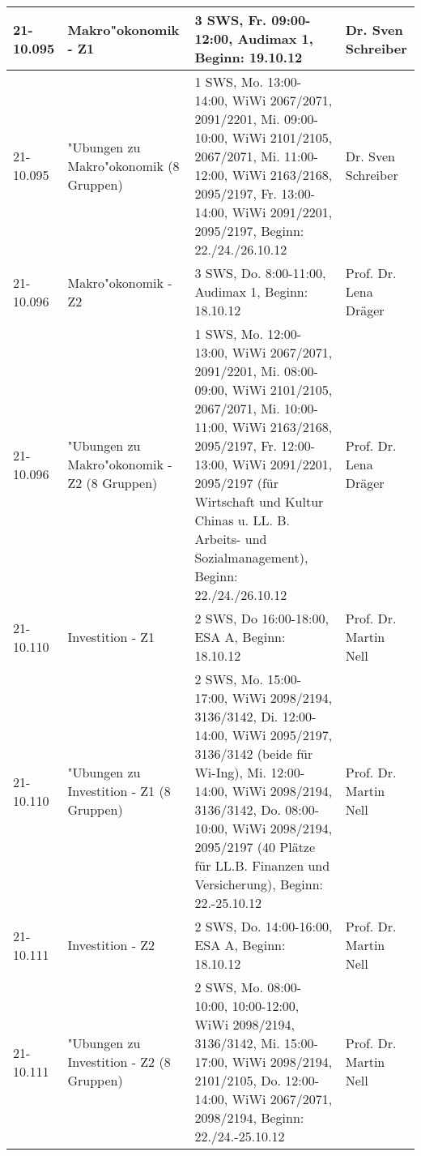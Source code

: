 \begin{tabularx}{\textwidth}{|l|X|X|X|}
%
%
\hline
\end{tabularx}
\begin{tabularx}{\textwidth}{|l|X|X|X|}
\hline 21-10.095 & Makro"okonomik - Z1
			& 3 SWS, Fr. 09:00-12:00, Audimax 1, Beginn: 19.10.12
			& Dr. Sven Schreiber \\
\hline 21-10.095 & "Ubungen zu Makro"okonomik (8 Gruppen)
			& 1 SWS, Mo. 13:00-14:00, WiWi 2067/2071, 2091/2201, Mi. 09:00-10:00, WiWi 2101/2105, 2067/2071, Mi. 11:00-12:00, WiWi 2163/2168, 2095/2197, Fr. 13:00-14:00, WiWi 2091/2201, 2095/2197, Beginn: 22./24./26.10.12
			& Dr. Sven Schreiber \\
\hline 21-10.096 & Makro"okonomik - Z2
			& 3 SWS, Do. 8:00-11:00, Audimax 1, Beginn: 18.10.12
			& Prof. Dr. Lena Dräger \\
\hline 21-10.096 & "Ubungen zu Makro"okonomik - Z2 (8 Gruppen)
			& 1 SWS, Mo. 12:00-13:00, WiWi 2067/2071, 2091/2201, Mi. 08:00-09:00, WiWi 2101/2105, 2067/2071, Mi. 10:00-11:00, WiWi 2163/2168, 2095/2197, Fr. 12:00-13:00, WiWi 2091/2201, 2095/2197 (für Wirtschaft und Kultur Chinas u. LL. B. Arbeits- und Sozialmanagement), Beginn: 22./24./26.10.12
			& Prof. Dr. Lena Dräger \\
\hline 21-10.110 & Investition - Z1
			& 2 SWS, Do 16:00-18:00, ESA A, Beginn: 18.10.12
			& Prof. Dr. Martin Nell \\
\hline 21-10.110 & "Ubungen zu Investition - Z1 (8 Gruppen)
			& 2 SWS, Mo. 15:00-17:00, WiWi 2098/2194, 3136/3142, Di. 12:00-14:00, WiWi 2095/2197, 3136/3142 (beide für Wi-Ing), Mi. 12:00-14:00, WiWi 2098/2194, 3136/3142, Do. 08:00-10:00, WiWi 2098/2194, 2095/2197 (40 Plätze für LL.B. Finanzen und Versicherung), Beginn: 22.-25.10.12
			& Prof. Dr. Martin Nell \\
\hline 21-10.111 & Investition - Z2
			& 2 SWS, Do. 14:00-16:00, ESA A, Beginn: 18.10.12
			& Prof. Dr. Martin Nell \\
\hline 21-10.111 & "Ubungen zu Investition - Z2 (8 Gruppen)
			& 2 SWS, Mo. 08:00-10:00, 10:00-12:00, WiWi 2098/2194, 3136/3142, Mi. 15:00-17:00, WiWi 2098/2194, 2101/2105, Do. 12:00-14:00, WiWi 2067/2071, 2098/2194, Beginn: 22./24.-25.10.12
			& Prof. Dr. Martin Nell \\
\hline
\end{tabularx}
